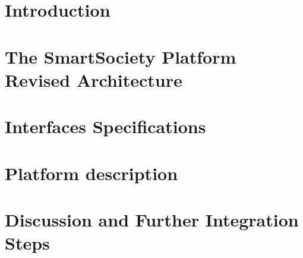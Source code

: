 \documentclass{SmartReport}
\begin{document}
\newpage


\section{Introduction}
\label{sec:intro}


\newpage


\section{The SmartSociety Platform Revised Architecture}
\label{sec:arch}

\newpage

\section{Interfaces Specifications}
\label{sec:apis}

\newpage


\section{Platform description}
\label{sec:sw}

\newpage

\section{Discussion and Further Integration Steps}
\label{sec:conclusions}

\newpage



%
\end{document}
